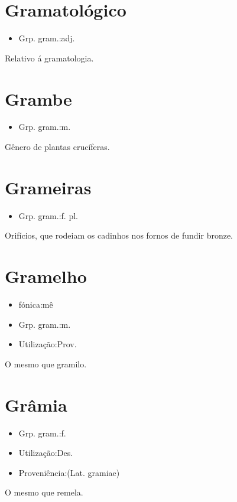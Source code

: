 \section{Gramatológico}
\begin{itemize}
\item {Grp. gram.:adj.}
\end{itemize}
Relativo á gramatologia.
\section{Grambe}
\begin{itemize}
\item {Grp. gram.:m.}
\end{itemize}
Gênero de plantas crucíferas.
\section{Grameiras}
\begin{itemize}
\item {Grp. gram.:f. pl.}
\end{itemize}
Orifícios, que rodeiam os cadinhos nos fornos de fundir bronze.
\section{Gramelho}
\begin{itemize}
\item {fónica:mê}
\end{itemize}
\begin{itemize}
\item {Grp. gram.:m.}
\end{itemize}
\begin{itemize}
\item {Utilização:Prov.}
\end{itemize}
O mesmo que \textunderscore gramilo\textunderscore .
\section{Grâmia}
\begin{itemize}
\item {Grp. gram.:f.}
\end{itemize}
\begin{itemize}
\item {Utilização:Des.}
\end{itemize}
\begin{itemize}
\item {Proveniência:(Lat. \textunderscore gramiae\textunderscore )}
\end{itemize}
O mesmo que \textunderscore remela\textunderscore .

